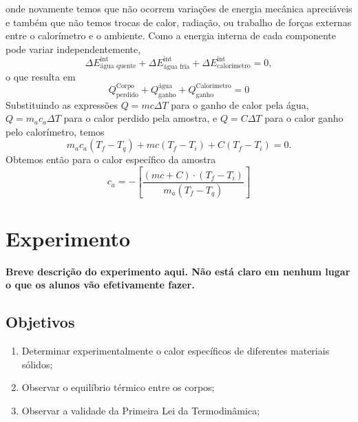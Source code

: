 \noindent{}onde novamente temos que não ocorrem variações de energia mecânica apreciáveis e também que não temos trocas de calor, radiação, ou trabalho de forças externas entre o calorímetro e o ambiente. Como a energia interna de cada componente pode variar independentemente,
\begin{equation}
    \Delta E_{\text{água quente}}^{\text{int}} + \Delta E_{\text{água fria}}^{\text{int}} + \Delta E_{\text{calorímetro}}^{\text{int}} = 0,
\end{equation}
%
o que resulta em
\begin{equation}
	Q^{\text{Corpo}}_{\text{perdido}} + Q^{\text{água}}_{\text{ganho}} + Q^{\text{Calorímetro}}_{\text{ganho}} = 0
\end{equation}
%
Substituindo as expressões $Q = m c \Delta T$ para o ganho de calor pela água, $Q = m_a c_a \Delta T$ para o calor perdido pela amostra, e $Q = C\Delta T$ para o calor ganho pelo calorímetro, temos
\begin{equation}
	m_a c_a (T_f - T_q) + m c (T_f - T_i) + C (T_f-T_i) = 0.
\end{equation}
%
Obtemos então para o calor específico da amostra
\begin{equation}
	c_a = - \left[\frac{(mc + C)\cdot(T_f - T_i)}{m_a (T_f - T_q)}\right]
\end{equation}

\section{Experimento}

\textbf{Breve descrição do experimento aqui. Não está claro em nenhum lugar o que os alunos vão efetivamente fazer.}

\subsection{Objetivos}
\label{Sec:ObjetivosCalorEspecifico}

\begin{enumerate}
	\item Determinar experimentalmente o calor específicos de diferentes materiais sólidos;
	\item Observar o equilíbrio térmico entre os corpos;
	\item Observar a validade da Primeira Lei da Termodinâmica;
\end{enumerate}

